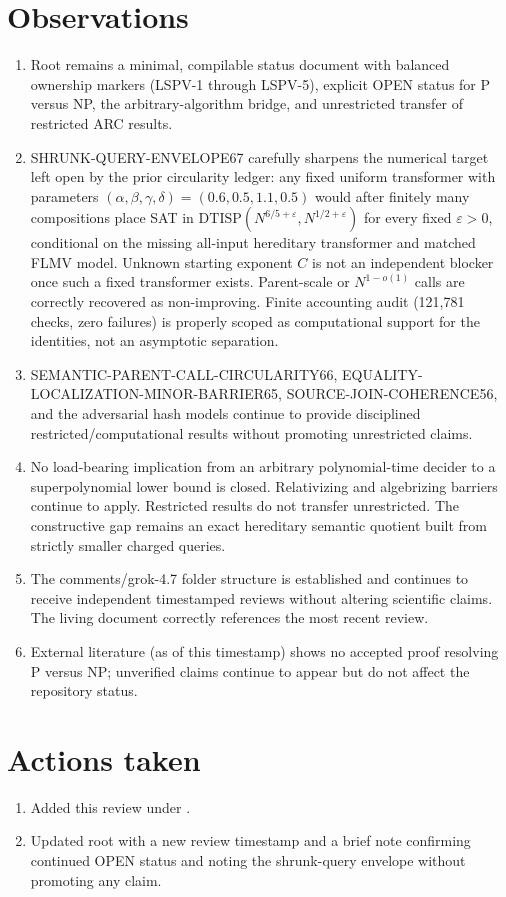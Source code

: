 \documentclass[11pt]{article}
\begin{document}
\section{Observations}
\begin{enumerate}
\item Root  remains a minimal, compilable status document with balanced ownership markers (LSPV-1 through LSPV-5), explicit OPEN status for P versus NP, the arbitrary-algorithm bridge, and unrestricted transfer of restricted ARC results.
\item SHRUNK-QUERY-ENVELOPE67 carefully sharpens the numerical target left open by the prior circularity ledger: any fixed uniform transformer with parameters $(\alpha,\beta,\gamma,\delta)=(0.6,0.5,1.1,0.5)$ would after finitely many compositions place SAT in $\mathrm{DTISP}(N^{6/5+\varepsilon},N^{1/2+\varepsilon})$ for every fixed $\varepsilon>0$, conditional on the missing all-input hereditary transformer and matched FLMV model. Unknown starting exponent $C$ is not an independent blocker once such a fixed transformer exists. Parent-scale or $N^{1-o(1)}$ calls are correctly recovered as non-improving. Finite accounting audit (121,781 checks, zero failures) is properly scoped as computational support for the identities, not an asymptotic separation.
\item SEMANTIC-PARENT-CALL-CIRCULARITY66, EQUALITY-LOCALIZATION-MINOR-BARRIER65, SOURCE-JOIN-COHERENCE56, and the adversarial hash models continue to provide disciplined restricted/computational results without promoting unrestricted claims.
\item No load-bearing implication from an arbitrary polynomial-time decider to a superpolynomial lower bound is closed. Relativizing and algebrizing barriers continue to apply. Restricted results do not transfer unrestricted. The constructive gap remains an exact hereditary semantic quotient built from strictly smaller charged queries.
\item The comments/grok-4.7 folder structure is established and continues to receive independent timestamped reviews without altering scientific claims. The living document correctly references the most recent review.
\item External literature (as of this timestamp) shows no accepted proof resolving P versus NP; unverified claims continue to appear but do not affect the repository status.
\end{enumerate}

\section{Actions taken}
\begin{enumerate}
\item Added this review under .
\item Updated root  with a new review timestamp and a brief note confirming continued OPEN status and noting the shrunk-query envelope without promoting any claim.
\end{enumerate}
\end{document}
